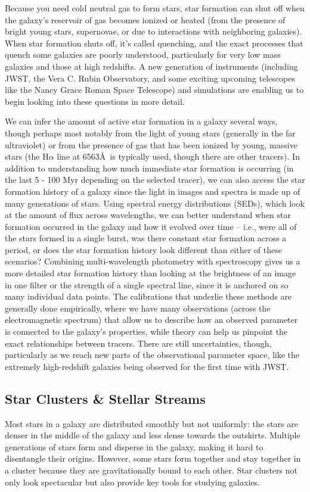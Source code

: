 Because you need cold neutral gas to form stars, star formation can shut off when the galaxy's reservoir of gas becomes ionized or heated (from the presence of bright young stars, supernovae, or due to interactions with neighboring galaxies). When star formation shuts off, it's called quenching, and the exact processes that quench some galaxies are poorly understood, particularly for very low mass galaxies and those at high redshifts. A new generation of instruments (including JWST, the Vera C. Rubin Observatory, and some exciting upcoming telescopes like the Nancy Grace Roman Space Telescope) and simulations are enabling us to begin looking into these questions in more detail.

We can infer the amount of active star formation in a galaxy several ways, though perhaps most notably from the light of young stars (generally in the far ultraviolet) or from the presence of gas that has been ionized by young, massive stars (the H$\alpha$ line at 6563\AA~is typically used, though there are other tracers). In addition to understanding how much immediate star formation is occurring (in the last 5 - 100 Myr depending on the selected tracer), we can also access the star formation history of a galaxy since the light in images and spectra is made up of many generations of stars. Using spectral energy distributions (SEDs), which look at the amount of flux across wavelengths, we can better understand when star formation occurred in the galaxy and how it evolved over time -- i.e., were all of the stars formed in a single burst, was there constant star formation across a period, or does the star formation history look different than either of these scenarios? Combining multi-wavelength photometry with spectroscopy gives us a more detailed star formation history than looking at the brightness of an image in one filter or the strength of a single spectral line, since it is anchored on so many individual data points. The calibrations that underlie these methods are generally done empirically, where we have many observations (across the electromagnetic spectrum) that allow us to describe how an observed parameter is connected to the galaxy's properties, while theory can help us pinpoint the exact relationships between tracers. There are still uncertainties, though, particularly as we reach new parts of the observational parameter space, like the extremely high-redshift galaxies being observed for the first time with JWST.

\subsection{Star Clusters \& Stellar Streams}
Most stars in a galaxy are distributed smoothly but not uniformly: the stars are denser in the middle of the galaxy and less dense towards the outskirts. Multiple generations of stars form and disperse in the galaxy, making it hard to disentangle their origins. However, some stars form together and stay together in a cluster because they are gravitationally bound to each other. Star clusters not only look spectacular but also provide key tools for studying galaxies.

